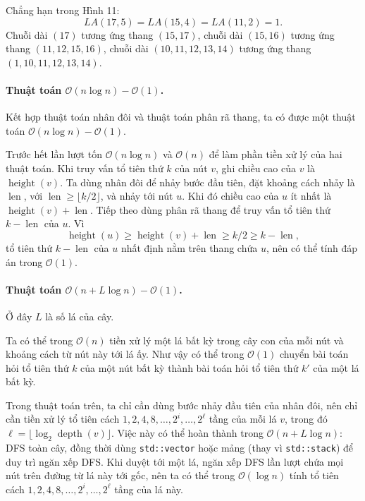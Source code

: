 \documentclass[11pt]{article}
\newcommand{\Oh}{\mathcal{O}}
\begin{document}
Chẳng hạn trong Hình 11:
\[
  LA(17,5)=LA(15,4)=LA(11,2)=1.
\]
Chuỗi dài \((17)\) tương ứng thang \((15,17)\), chuỗi dài \((15,16)\) tương
ứng thang \((11,12,15,16)\), chuỗi dài \((10,11,12,13,14)\) tương ứng thang
\((1,10,11,12,13,14)\).

\paragraph{Thuật toán \(\Oh(n\log n)-\Oh(1)\).}
Kết hợp thuật toán nhân đôi và thuật toán phân rã thang, ta có được một thuật
toán \(\Oh(n\log n)-\Oh(1)\).

Trước hết lần lượt tốn \(\Oh(n\log n)\) và \(\Oh(n)\) để làm phần tiền xử lý
của hai thuật toán. Khi truy vấn tổ tiên thứ \(k\) của nút \(v\), ghi chiều
cao của \(v\) là \(\operatorname{height}(v)\). Ta dùng nhân đôi để nhảy bước
đầu tiên, đặt khoảng cách nhảy là \(\operatorname{len}\), với
\(\operatorname{len}\ge \lfloor k/2\rfloor\), và nhảy tới nút \(u\). Khi đó
chiều cao của \(u\) ít nhất là
\(\operatorname{height}(v)+\operatorname{len}\). Tiếp theo dùng phân rã thang
để truy vấn tổ tiên thứ \(k-\operatorname{len}\) của \(u\). Vì
\[
  \operatorname{height}(u)\ge
  \operatorname{height}(v)+\operatorname{len}
  \ge k/2
  \ge k-\operatorname{len},
\]
tổ tiên thứ \(k-\operatorname{len}\) của \(u\) nhất định nằm trên thang chứa
\(u\), nên có thể tính đáp án trong \(\Oh(1)\).

\paragraph{Thuật toán \(\Oh(n+L\log n)-\Oh(1)\).}
Ở đây \(L\) là số lá của cây.

Ta có thể trong \(\Oh(n)\) tiền xử lý một lá bất kỳ trong cây con của mỗi nút
và khoảng cách từ nút này tới lá ấy. Như vậy có thể trong \(\Oh(1)\) chuyển
bài toán hỏi tổ tiên thứ \(k\) của một nút bất kỳ thành bài toán hỏi tổ tiên
thứ \(k'\) của một lá bất kỳ.

Trong thuật toán trên, ta chỉ cần dùng bước nhảy đầu tiên của nhân đôi, nên
chỉ cần tiền xử lý tổ tiên cách \(1,2,4,8,\ldots,2^i,\ldots,2^\ell\) tầng của
mỗi lá \(v\), trong đó
\(\ell=\lfloor\log_2\operatorname{depth}(v)\rfloor\). Việc này có thể hoàn
thành trong \(\Oh(n+L\log n)\): DFS toàn cây, đồng thời dùng
\texttt{std::vector} hoặc mảng (thay vì \texttt{std::stack}) để duy trì ngăn
xếp DFS. Khi duyệt tới một lá, ngăn xếp DFS lần lượt chứa mọi nút trên đường
từ lá này tới gốc, nên ta có thể trong \(\Oh(\log n)\) tính tổ tiên cách
\(1,2,4,8,\ldots,2^i,\ldots,2^\ell\) tầng của lá này.
\end{document}
